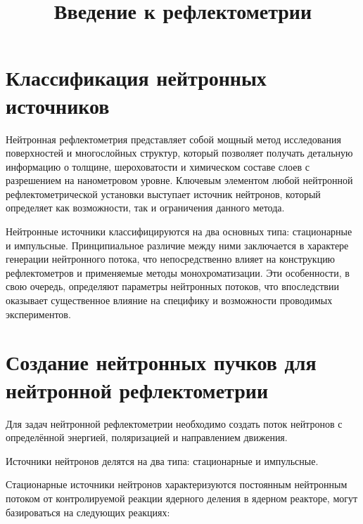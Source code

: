 \documentclass[a4paper]{article}
\title{Введение к рефлектометрии}
\author{}
\date{}
\begin{document}
\maketitle

\section{Классификация нейтронных источников}
Нейтронная рефлектометрия представляет собой мощный метод исследования поверхностей и многослойных структур, который позволяет получать детальную информацию о толщине, шероховатости и химическом составе слоев с разрешением на нанометровом уровне. Ключевым элементом любой нейтронной рефлектометрической установки выступает источник нейтронов, который определяет как возможности, так и ограничения данного метода.

Нейтронные источники классифицируются на два основных типа: стационарные и импульсные. Принципиальное различие между ними заключается в характере генерации нейтронного потока, что непосредственно влияет на конструкцию рефлектометров и применяемые методы монохроматизации. Эти особенности, в свою очередь, определяют параметры нейтронных потоков, что впоследствии оказывает существенное влияние на специфику и возможности проводимых экспериментов.

\section*{Создание нейтронных пучков для нейтронной рефлектометрии}

Для задач нейтронной рефлектометрии необходимо создать поток нейтронов с определённой энергией, поляризацией и направлением движения.

Источники нейтронов делятся на два типа: стационарные и импульсные.

Стационарные источники нейтронов характеризуются постоянным нейтронным потоком от контролируемой реакции ядерного деления в ядерном реакторе, могут базироваться на следующих реакциях:
\end{document}
